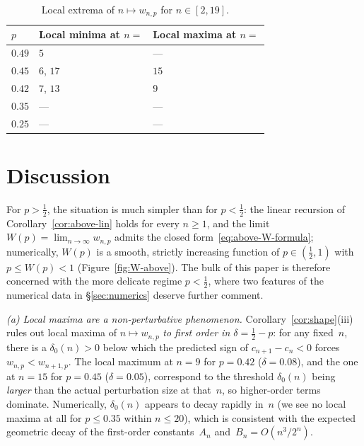 \documentclass[reqno,final,11pt]{amsart}
\theoremstyle{plain}
\theoremstyle{definition}
\theoremstyle{remark}
\begin{document}
\begin{table}[h]
\centering
\begin{tabular}{lll}
\toprule
$p$ & Local minima at $n=$ & Local maxima at $n=$ \\
\midrule
$0.49$ & $5$ & --- \\
$0.45$ & $6$, $17$ & $15$ \\
$0.42$ & $7$, $13$ & $9$ \\
$0.35$ & --- & --- \\
$0.25$ & --- & --- \\
\bottomrule
\end{tabular}
\caption{Local extrema of $n\mapsto w_{n,p}$ for
  $n\in[2,19]$.}\label{tab:extrema}
\end{table}

\section{Discussion}\label{sec:discussion}

For $p>\tfrac12$, the situation is much simpler than for
$p<\tfrac12$: the linear recursion of
Corollary~\ref{cor:above-lin} holds for every $n\ge 1$, and the
limit $W(p)=\lim_{n\to\infty}w_{n,p}$ admits the closed
form~\eqref{eq:above-W-formula}; numerically, $W(p)$ is a
smooth, strictly increasing function of $p\in(\tfrac12,1)$ with
$p\le W(p)<1$ (Figure~\ref{fig:W-above}).  The bulk of this
paper is therefore concerned with the more delicate regime
$p<\tfrac12$, where two features of the numerical data in
\S\ref{sec:numerics} deserve further comment.

\emph{(a) Local maxima are a non-perturbative phenomenon.}
Corollary~\ref{cor:shape}(iii) rules out local maxima of
$n\mapsto w_{n,p}$ \emph{to first order in $\delta=\tfrac12-p$}:
for any fixed~$n$, there is a $\delta_0(n)>0$ below which the
predicted sign of $c_{n+1}-c_n<0$ forces~$w_{n,p}<w_{n+1,p}$.
The local maximum at $n=9$ for $p=0.42$ ($\delta=0.08$), and the
one at $n=15$ for $p=0.45$ ($\delta=0.05$), correspond to the
threshold $\delta_0(n)$ being \emph{larger} than the actual
perturbation size at that~$n$, so higher-order terms dominate.
Numerically, $\delta_0(n)$ appears to decay rapidly in~$n$ (we
see no local maxima at all for $p\le 0.35$ within $n\le 20$),
which is consistent with the expected geometric decay of the
first-order constants~$A_n$ and~$B_n=O(n^3/2^n)$.
\end{document}
